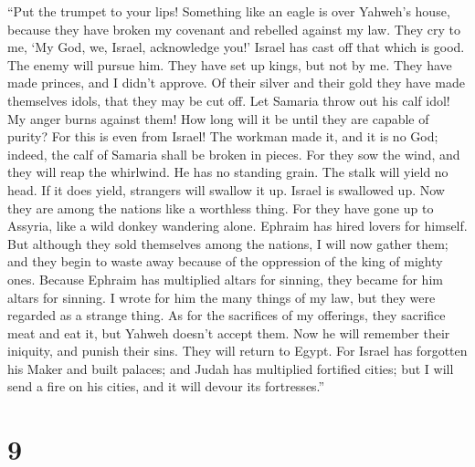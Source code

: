  ``Put the trumpet to your lips! Something like an eagle
is over Yahweh's house, because they have broken my covenant and
rebelled against my law.  They cry to me, `My God, we,
Israel, acknowledge you!'  Israel has cast off that which
is good. The enemy will pursue him.  They have set up
kings, but not by me. They have made princes, and I didn't approve. Of
their silver and their gold they have made themselves idols, that they
may be cut off.  Let Samaria throw out his calf idol! My
anger burns against them! How long will it be until they are capable of
purity?  For this is even from Israel! The workman made
it, and it is no God; indeed, the calf of Samaria shall be broken in
pieces.  For they sow the wind, and they will reap the
whirlwind. He has no standing grain. The stalk will yield no head. If it
does yield, strangers will swallow it up.  Israel is
swallowed up. Now they are among the nations like a worthless thing.
 For they have gone up to Assyria, like a wild donkey
wandering alone. Ephraim has hired lovers for himself. 
But although they sold themselves among the nations, I will now gather
them; and they begin to waste away because of the oppression of the king
of mighty ones.  Because Ephraim has multiplied altars
for sinning, they became for him altars for sinning.  I
wrote for him the many things of my law, but they were regarded as a
strange thing.  As for the sacrifices of my offerings,
they sacrifice meat and eat it, but Yahweh doesn't accept them. Now he
will remember their iniquity, and punish their sins. They will return to
Egypt.  For Israel has forgotten his Maker and built
palaces; and Judah has multiplied fortified cities; but I will send a
fire on his cities, and it will devour its fortresses.''

\hypertarget{section-8}{%
\section{9}\label{section-8}}

